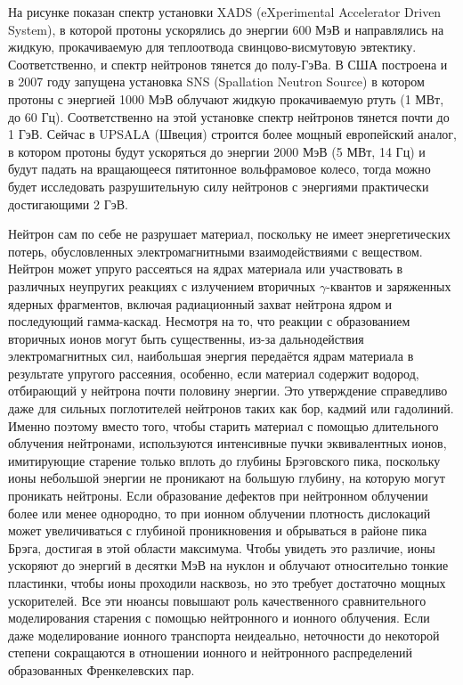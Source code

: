 \documentclass[a4paper,12pt]{article}
\begin{document}
\begin{large}
  На рисунке показан спектр установки XADS (eXperimental Accelerator Driven System), в которой протоны ускорялись до энергии 600 МэВ и направлялись на жидкую, прокачиваемую для теплоотвода свинцово-висмутовую эвтектику.
  Соответственно, и спектр нейтронов тянется до полу-ГэВа.
  В США построена и в 2007 году запущена установка SNS (Spallation Neutron Source) в котором протоны с энергией 1000 МэВ облучают жидкую прокачиваемую ртуть (1 МВт, до 60 Гц).
  Соответственно на этой установке спектр нейтронов тянется почти до 1 ГэВ.
  Сейчас в UPSALA (Швеция) строится более мощный европейский аналог, в котором протоны будут ускоряться до энергии 2000 МэВ (5 МВт, 14 Гц) и будут падать на вращающееся пятитонное вольфрамовое колесо, тогда можно будет исследовать разрушительную силу нейтронов с энергиями практически достигающими 2 ГэВ.

	Нейтрон сам по себе не разрушает материал, поскольку не имеет энергетических потерь, обусловленных электромагнитными взаимодействиями с веществом.
	Нейтрон может упруго рассеяться на ядрах материала или участвовать в различных неупругих реакциях с излучением вторичных $\gamma$-квантов и заряженных ядерных фрагментов, включая радиационный захват нейтрона ядром и последующий гамма-каскад.
	Несмотря на то, что реакции с образованием вторичных ионов могут быть существенны, из-за дальнодействия электромагнитных сил, наибольшая энергия передаётся ядрам материала в результате упругого рассеяния, особенно, если материал содержит водород, отбирающий у нейтрона почти половину энергии.
	Это утверждение справедливо даже для сильных поглотителей нейтронов таких как бор, кадмий или гадолиний.
	Именно поэтому вместо того, чтобы старить материал с помощью длительного облучения нейтронами, используются интенсивные пучки эквивалентных ионов, имитирующие старение только вплоть до глубины Брэговского пика, поскольку ионы небольшой энергии не проникают на большую глубину, на которую могут проникать нейтроны.
	Если образование дефектов при нейтронном облучении более или менее однородно, то при ионном облучении плотность дислокаций может увеличиваться с глубиной проникновения и обрываться в районе пика Брэга, достигая в этой области максимума.
	Чтобы увидеть это различие, ионы ускоряют до энергий в десятки МэВ на нуклон и облучают относительно тонкие пластинки, чтобы ионы проходили насквозь, но это требует достаточно мощных ускорителей.
	Все эти нюансы повышают роль качественного сравнительного моделирования старения с помощью нейтронного и ионного облучения.
	Если даже моделирование ионного транспорта неидеально, неточности до некоторой степени сокращаются в отношении ионного и нейтронного распределений образованных Френкелевских пар.


\end{large}
\end{document}
